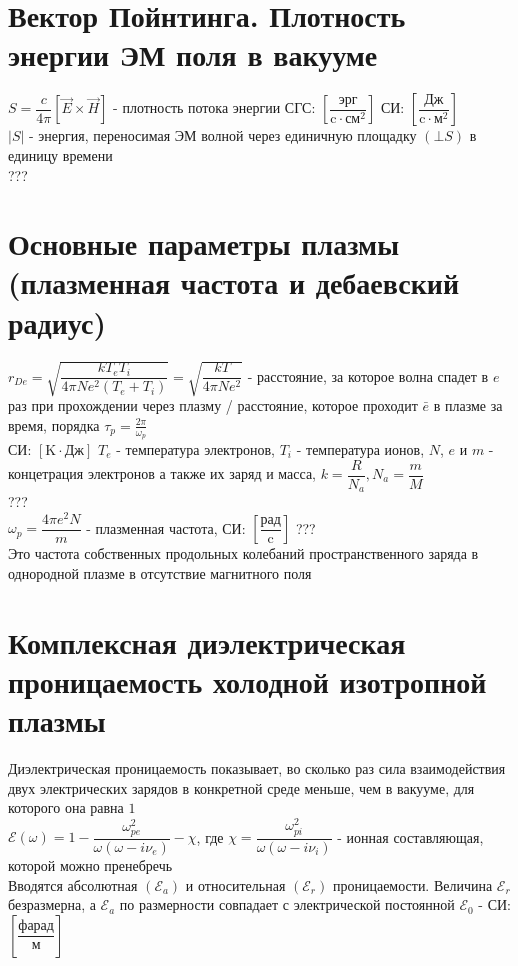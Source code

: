 \begin{multicols*}{2}
		\section{Вектор Пойнтинга. Плотность энергии ЭМ поля в вакууме}

		$S = \dfrac{c}{4\pi} \left[\vec{E}\times \vec{H}\right]$ - плотность потока энергии \quad СГС: $\left[\dfrac{\text{эрг}}{\text{c}\cdot \text{см}^2}\right]$ \quad СИ: $\left[\dfrac{\text{Дж}}{\text{c}\cdot \text{м}^2}\right]$\\
		$\left\lvert S\right\rvert$ - энергия, переносимая ЭМ волной через единичную площадку $(\bot S)$ в единицу времени\\
		???

		\section{Основные параметры плазмы (плазменная частота и дебаевский радиус)}
		$r_{De} = \sqrt{\dfrac{k T_e T_i}{4\pi N e^2(T_e + T_i)}} = \sqrt{\dfrac{k T}{4\pi N e^2}}$ - расстояние, за которое волна спадет в $e$ раз при прохождении через плазму / расстояние, которое проходит $\bar{e}$ в плазме за время, порядка $\tau_p = \frac{2\pi}{\omega_p}$\\
		СИ: $\left[{\text{K}}\cdot {\text{Дж}}\right]$
		$T_e$ - температура электронов, $T_i$ - температура ионов, $N$, $e$ и $m$ - концетрация электронов а также их заряд и масса, $k = \dfrac{R}{N_a}, N_a = \dfrac{m}{M}$\\
		???\\
		$\omega_p = \dfrac{4\pi e^2 N}{m}$ - плазменная частота, СИ: $\left[\dfrac{\text{рад}}{\text{c}}\right]$ ???\\
		Это частота собственных продольных колебаний пространственного заряда в однородной плазме в отсутствие магнитного поля

		\section{Комплексная диэлектрическая проницаемость холодной изотропной плазмы}
		Диэлектрическая проницаемость показывает, во сколько раз сила взаимодействия двух электрических зарядов в конкретной среде меньше, чем в вакууме, для которого она равна $1$\\
		$\mathcal{E} (\omega) = 1 - \dfrac{\omega_{pe}^2}{\omega(\omega - i\nu_e)} - \chi $, где $\chi = \dfrac{\omega_{pi}^2}{\omega(\omega - i\nu_i)}$ - ионная составляющая, которой можно пренебречь\\
		Вводятся абсолютная $(\mathcal{E}_a)$ и относительная $(\mathcal{E}_r)$ проницаемости. Величина $\mathcal{E} _{r}$ безразмерна, а ${\displaystyle \mathcal{E} _{a}}$ по размерности совпадает с электрической постоянной $\mathcal{E}_{0}$ - СИ: $\left[\dfrac{\text{фарад}}{\text{м}}\right]$


	\end{multicols*}


